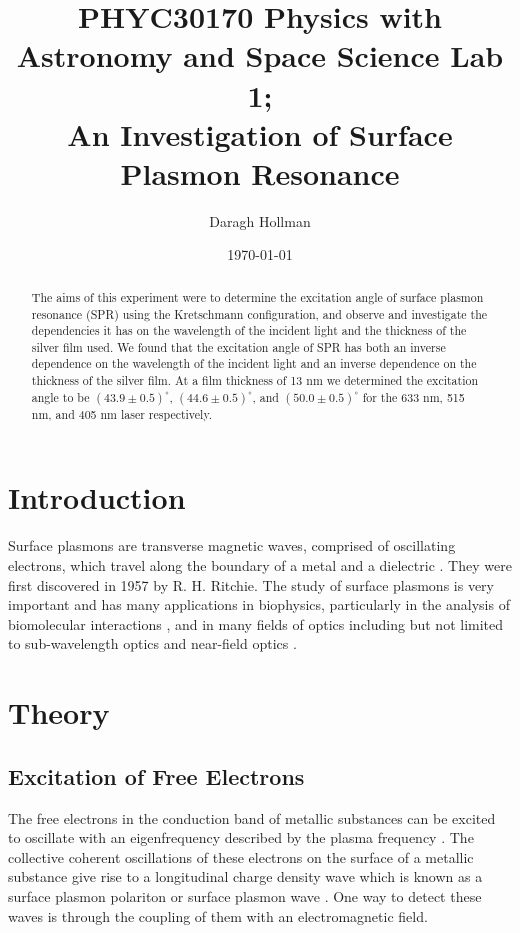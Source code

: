 \documentclass[%
reprint,
amsmath,amssymb,
aps,
]{revtex4-2}
\begin{document}
	
	
	\title{PHYC30170 Physics with Astronomy and Space Science Lab 1;\\An Investigation of Surface Plasmon Resonance}
	
	\author{Daragh Hollman}
	
	\date{\today}
	
	\begin{abstract}
		The aims of this experiment were to determine the excitation angle of surface plasmon resonance (SPR) using the Kretschmann configuration, and observe and investigate the dependencies it has on the wavelength of the incident light and the thickness of the silver film used. We found that the excitation angle of SPR has both an inverse dependence on the wavelength of the incident light and an inverse dependence on the thickness of the silver film.  At a film thickness of 13 nm we determined the excitation angle to be $(43.9\pm0.5)^\circ$, $(44.6\pm0.5)^\circ$, and $(50.0\pm0.5)^\circ$ for the 633 nm, 515 nm, and 405 nm laser respectively.
	\end{abstract}

	\maketitle
	
	\section{Introduction}		
		Surface plasmons are transverse magnetic waves, comprised of oscillating electrons, which travel along the boundary of a metal and a dielectric \cite{undergradToledo}. They were first discovered in 1957 by R. H. Ritchie. The study of surface plasmons is very important and has many applications in biophysics, particularly in the analysis of biomolecular interactions \cite{biomedicalApplications}, and in many fields of optics including but not limited to sub-wavelength optics and near-field optics \cite{opticalApplications}.
	
	\section{Theory}
		\subsection{Excitation of Free Electrons}
			The free electrons in the conduction band of metallic substances can be excited to oscillate with an eigenfrequency described by the plasma frequency \cite{pluchery}. The collective coherent oscillations of these electrons on the surface of a metallic substance give rise to a longitudinal charge density wave which is known as a surface plasmon polariton or surface plasmon wave \cite{pluchery}\cite{zeng}. One way to detect these waves is through the coupling of them with an electromagnetic field.
			
\end{document}
